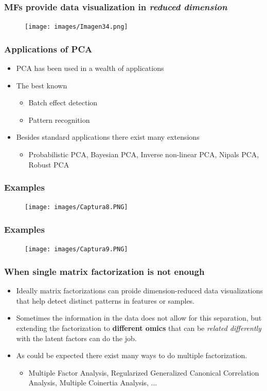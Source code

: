 \documentclass{beamer}
\begin{document}
\begin{frame}
	\frametitle{MFs provide data visualization in \textit{reduced dimension}}
	\begin{figure}[ht]
		\centering
		\texttt{[image: images/Imagen34.png]}
	\end{figure}
\end{frame}


\begin{frame}
	\frametitle{Applications of PCA}
	\begin{itemize}
		\item PCA has been used in a wealth of applications 
		\item The best known 
		\begin{itemize}
			\item Batch effect detection
			\item Pattern recognition
		\end{itemize}
		\item Besides standard applications there exist many extensions
		\begin{itemize}
			\item Probabilistic PCA, Bayesian PCA, Inverse non-linear PCA, Nipals PCA, Robust PCA
		\end{itemize}
	\end{itemize}
\end{frame}



\begin{frame}
	\frametitle{Examples}
	\begin{figure}[ht]
		\centering
		\texttt{[image: images/Captura8.PNG]}
	\end{figure}
\end{frame}


\begin{frame}
	\frametitle{Examples}
	\begin{figure}[ht]
		\centering
		\texttt{[image: images/Captura9.PNG]}
	\end{figure}
\end{frame}

\begin{frame}
	\frametitle{When single matrix factorization is not enough}
	\begin{itemize}
		\item Ideally matrix factorizations can proide dimension-reduced data visualizations that help detect distinct patterns in features or samples.
		\item Sometimes the information in the data does not allow for this separation, but extending the factorization to \textbf{different omics} that can be \textit{related differently} with the latent factors can do the job.
		\item As could be expected there exist many ways to do multiple factorization.
		\begin{itemize}
			\item Multiple Factor Analysis, Regularized Generalized Canonical Correlation Analysis, Multiple Coinertia Analysis, ...
		\end{itemize}
	\end{itemize}
\end{frame}
\end{document}
